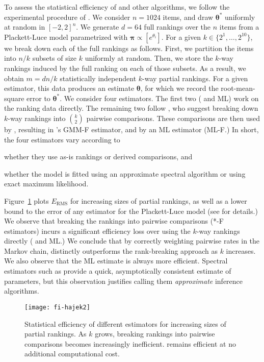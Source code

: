 To assess the statistical efficiency of \LSR{} and other algorithms, we follow the experimental procedure of \citet{hajek2014minimax}.
We consider $n = 1024$ items, and draw $\bm{\theta}^*$ uniformly at random in $[-2, 2]^n$.
We generate $d = 64$ full rankings over the $n$ items from a Plackett-Luce model parametrized with $\bm{\pi} \propto [e^{\theta_i}]$.
For a given $k \in \{2^1, \ldots, 2^{10}\}$, we break down each of the full rankings as follows.
First, we partition the items into $n/k$ subsets of size $k$ uniformly at random.
Then, we store the $k$-way rankings induced by the full ranking on each of those subsets.
As a result, we obtain $m = dn/k$ statistically independent $k$-way partial rankings.
For a given estimator, this data produces an estimate $\bm{\theta}$, for which we record the root-mean-square error to $\bm{\theta}^*$.
We consider four estimators.
The first two (\LSR{} and ML) work on the ranking data directly.
The remaining two follow \citet{azari2013generalized}, who suggest breaking down $k$-way rankings into $\binom{k}{2}$ pairwise comparisons.
These comparisons are then used by \LSR{}, resulting in \citeauthor{azari2013generalized}'s GMM-F estimator, and by an ML estimator (ML-F.)
In short, the four estimators vary according to
\begin{enuminline}
\item whether they use as-is rankings or derived comparisons, and
\item whether the model is fitted using an approximate spectral algorithm or using exact maximum likelihood.
\end{enuminline}
Figure~\ref{fig:efficiency} plots $E_{\text{RMS}}$ for increasing sizes of partial rankings, as well as a lower bound to the error of any estimator for the Plackett-Luce model (see \citet{hajek2014minimax} for details.)
We observe that breaking the rankings into pairwise comparisons (*-F estimators) incurs a significant efficiency loss over using the $k$-way rankings directly (\LSR{} and ML.)
We conclude that by correctly weighting pairwise rates in the Markov chain, \LSR{} distinctly outperforms the rank-breaking approach as $k$ increases.
We also observe that the ML estimate is always more efficient.
Spectral estimators such as \LSR{} provide a quick, asymptotically consistent estimate of parameters, but this observation justifies calling them \emph{approximate} inference algorithms.


\begin{figure}[ht]
\centering
\texttt{[image: fi-hajek2]}
\vskip -0.1in
\caption{
Statistical efficiency of different estimators for increasing sizes of partial rankings.
As $k$ grows, breaking rankings into pairwise comparisons becomes increasingly inefficient.
\LSR{} remains efficient at no additional computational cost.
}
\vskip -0.1in
\label{fig:efficiency}
\end{figure}

